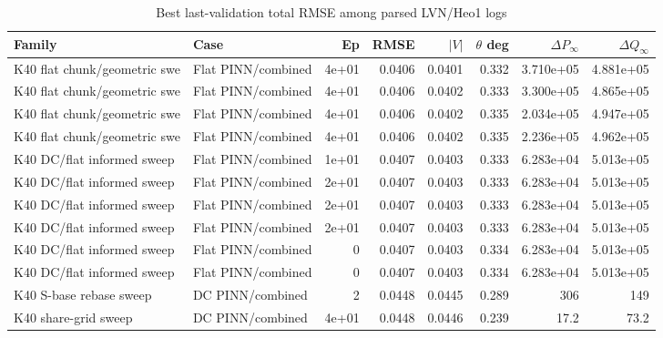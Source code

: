 \documentclass[10pt]{article}
\begin{document}
\begin{table}[t]
\centering
\caption{Best last-validation total RMSE among parsed LVN/Heo1 logs}
\scriptsize
\begin{tabular}{llrrrrrr}
\toprule
Family & Case & Ep & RMSE & $|V|$ & $\theta$ deg & $\Delta P_\infty$ & $\Delta Q_\infty$ \\
\midrule
K40 flat chunk/geometric swe & Flat PINN/combined & 4e+01 & 0.0406 & 0.0401 & 0.332 & 3.710e+05 & 4.881e+05 \\
K40 flat chunk/geometric swe & Flat PINN/combined & 4e+01 & 0.0406 & 0.0402 & 0.333 & 3.300e+05 & 4.865e+05 \\
K40 flat chunk/geometric swe & Flat PINN/combined & 4e+01 & 0.0406 & 0.0402 & 0.335 & 2.034e+05 & 4.947e+05 \\
K40 flat chunk/geometric swe & Flat PINN/combined & 4e+01 & 0.0406 & 0.0402 & 0.335 & 2.236e+05 & 4.962e+05 \\
K40 DC/flat informed sweep & Flat PINN/combined & 1e+01 & 0.0407 & 0.0403 & 0.333 & 6.283e+04 & 5.013e+05 \\
K40 DC/flat informed sweep & Flat PINN/combined & 2e+01 & 0.0407 & 0.0403 & 0.333 & 6.283e+04 & 5.013e+05 \\
K40 DC/flat informed sweep & Flat PINN/combined & 2e+01 & 0.0407 & 0.0403 & 0.333 & 6.283e+04 & 5.013e+05 \\
K40 DC/flat informed sweep & Flat PINN/combined & 2e+01 & 0.0407 & 0.0403 & 0.333 & 6.283e+04 & 5.013e+05 \\
K40 DC/flat informed sweep & Flat PINN/combined & 0 & 0.0407 & 0.0403 & 0.334 & 6.283e+04 & 5.013e+05 \\
K40 DC/flat informed sweep & Flat PINN/combined & 0 & 0.0407 & 0.0403 & 0.334 & 6.283e+04 & 5.013e+05 \\
K40 S-base rebase sweep & DC PINN/combined & 2 & 0.0448 & 0.0445 & 0.289 & 306 & 149 \\
K40 share-grid sweep & DC PINN/combined & 4e+01 & 0.0448 & 0.0446 & 0.239 & 17.2 & 73.2 \\
\bottomrule
\end{tabular}
\end{table}
\end{document}
